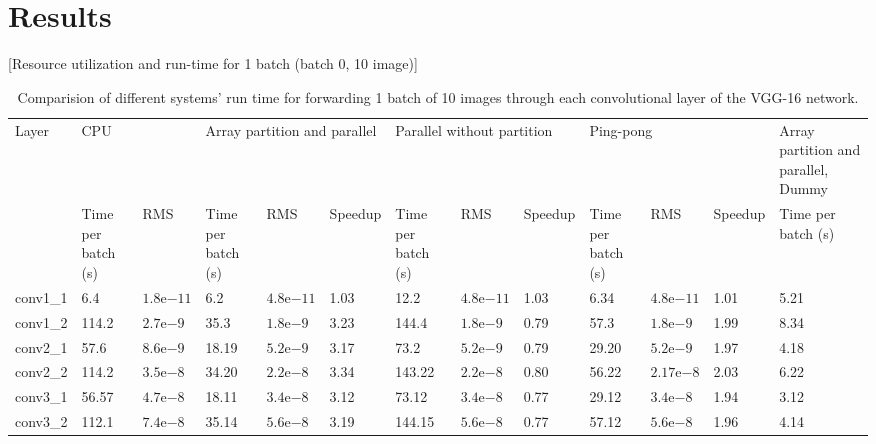 \documentclass[conference]{IEEEtran}
\newcommand{\expnumber}[2]{{#1}\mathrm{e}{#2}}
\begin{document}
\section{Results}
[Resource utilization and run-time for 1 batch (batch 0, 10 image)]
\begin{table*}[ht]
\caption{Comparision of different systems' run time for forwarding 1 batch of 10 images through each convolutional layer of the VGG-16 network.}
\centering
\begin{tabular}{| p{} | p{} | p{} | p{} | p{} | p{} | p{} | p{} | p{} | p{} | p{} | p{} | p{} | }
\hline
Layer & \multicolumn{2}{|p{0.10\textwidth}|}{CPU} & \multicolumn{3}{|p{0.151\textwidth}|}{Array partition and parallel} & \multicolumn{3}{|p{0.15\textwidth}|}{Parallel without partition} & \multicolumn{3}{|p{0.15\textwidth}|}{Ping-pong} & Array partition and parallel, Dummy \\
\cline{2-13}
	&	Time per batch (s)	& RMS  & Time per batch (s)	& RMS & Speedup & Time per batch (s)	& RMS & Speedup & Time per batch (s)	& RMS & Speedup & Time per batch (s)\\
\hline 
conv1\_1 & 6.4 & $\expnumber{1.8}{-11}$ & 6.2 & $\expnumber{4.8}{-11}$ & 1.03  & 12.2 & $\expnumber{4.8}{-11}$ & 1.03 & 6.34 & $\expnumber{4.8}{-11}$ & 1.01 & 5.21 \\
\hline
conv1\_2 & 114.2 & $\expnumber{2.7}{-9}$ & 35.3 & $\expnumber{1.8}{-9}$ & 3.23  & 144.4 & $\expnumber{1.8}{-9}$ & 0.79 & 57.3 & $\expnumber{1.8}{-9}$ & 1.99 & 8.34\\
\hline
conv2\_1 & 57.6 & $\expnumber{8.6}{-9}$ & 18.19 & $\expnumber{5.2}{-9}$ & 3.17  & 73.2 & $\expnumber{5.2}{-9}$ & 0.79 & 29.20 & $\expnumber{5.2}{-9}$ & 1.97 & 4.18\\
\hline
conv2\_2 & 114.2 & $\expnumber{3.5}{-8}$ & 34.20 & $\expnumber{2.2}{-8}$ & 3.34  & 143.22 & $\expnumber{2.2}{-8}$ & 0.80 & 56.22 & $\expnumber{2.17}{-8}$ & 2.03 & 6.22\\
\hline
conv3\_1 & 56.57 & $\expnumber{4.7}{-8}$ & 18.11 & $\expnumber{3.4}{-8}$ & 3.12  & 73.12 & $\expnumber{3.4}{-8}$ & 0.77 & 29.12 & $\expnumber{3.4}{-8}$ & 1.94 & 3.12\\
\hline
conv3\_2 & 112.1 & $\expnumber{7.4}{-8}$ & 35.14 & $\expnumber{5.6}{-8}$ & 3.19  & 144.15 & $\expnumber{5.6}{-8}$ & 0.77 & 57.12 & $\expnumber{5.6}{-8}$ & 1.96 & 4.14\\

\end{tabular}
\end{table*}
\end{document}
